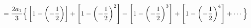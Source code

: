 \documentclass[preview]{standalone}
\begin{document}
\begin{align*}
\special{dvisvgm:raw <g id='unique000'>}=\frac{2a_1}{3}\Big\{\left[1-\left(-\frac{1}{2}\right)\right]+\left[1-\left(-\frac{1}{2}\right)^2\right]+\left[1-\left(-\frac{1}{2}\right)^3\right]+\left[1-\left(-\frac{1}{2}\right)^4\right]+\cdots\Big\}\special{dvisvgm:raw </g>}
\end{align*}
\end{document}
